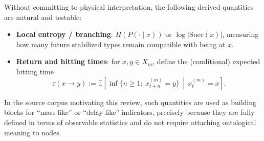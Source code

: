 Without committing to physical interpretation, the following derived quantities are natural and testable:
\begin{itemize}[leftmargin=*,itemsep=2pt]
  \item \textbf{Local entropy / branching}: $H(P(\cdot\mid x))$ or $\log|\mathrm{Succ}(x)|$, measuring how many future stabilized types remain compatible with being at $x$.
  \item \textbf{Return and hitting times}: for $x,y\in X_m$, define the (conditional) expected hitting time
  \[
  \tau(x\to y):=\mathbb{E}\!\left[\inf\{n\ge 1:\ x_{t+n}^{(m)}=y\}\,\middle|\,x_t^{(m)}=x\right].
  \]
\end{itemize}
In the source corpus motivating this review, such quantities are used as building blocks for ``mass-like'' or ``delay-like'' indicators, precisely because they are fully defined in terms of observable statistics and do not require attaching ontological meaning to nodes.

